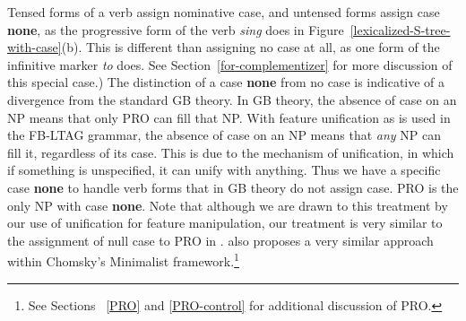 Tensed forms of a verb assign nominative case, and untensed forms
assign case {\bf none}, as the progressive form of the verb {\it sing}
does in Figure~\ref{lexicalized-S-tree-with-case}(b). This is
different than assigning no case at all, as one form of the infinitive
marker {\it to} does. See Section~\ref{for-complementizer} for more
discussion of this special case.) The distinction of a case {\bf none}
from no case is indicative of a divergence from the standard GB
theory.  In GB theory, the absence of case on an NP means that only
PRO can fill that NP.  With feature unification as is used in the
FB-LTAG grammar, the absence of case on an NP means that {\em any\/}
NP can fill it, regardless of its case.  This is due to the mechanism
of unification, in which if something is unspecified, it can unify
with anything.  Thus we have a specific case {\bf none} to handle verb
forms that in GB theory do not assign case.  PRO is the only NP with
case {\bf none}.  Note that although we are drawn to this treatment by
our use of unification for feature manipulation, our treatment is very
similar to the assignment of null case to PRO in
\cite{ChomskyLasnik93}.  \cite{watanabe93} also proposes a very similar 
approach within Chomsky's Minimalist framework.\footnote{See Sections~
\ref{PRO} and \ref{PRO-control}
for additional discussion of PRO.}


